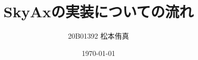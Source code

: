 \documentclass[a4paper,11pt,titlepage,uplatex]{jsarticle}
\title{SkyAxの実装についての流れ}
\author{20B01392 松本侑真}
\date{\today}
\begin{document}
\maketitle
\begin{abstract}

\end{abstract}
\tableofcontents
\newpage
\end{document}
